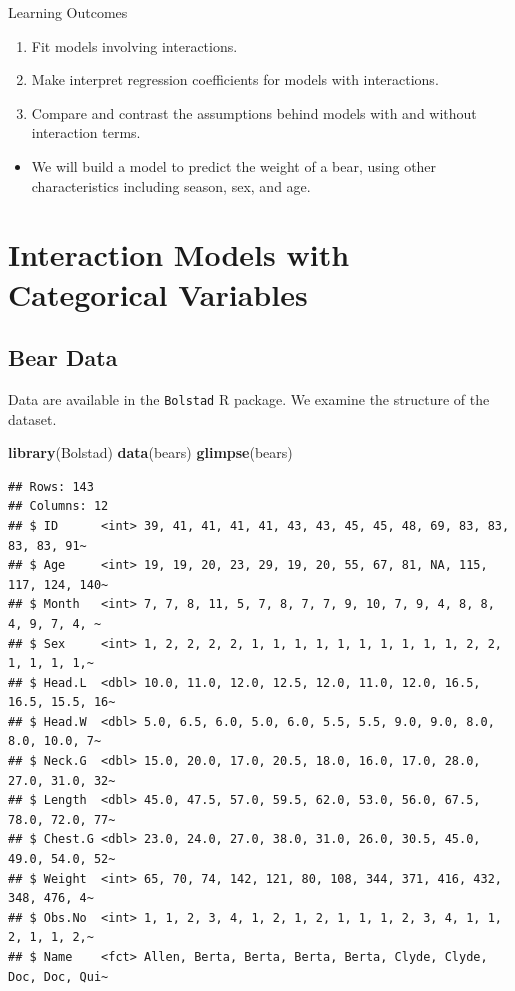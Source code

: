 \documentclass[]{book}
\newenvironment{Shaded}{\begin{snugshade}}{\end{snugshade}}
\newcommand{\KeywordTok}[1]{\textcolor[rgb]{0.13,0.29,0.53}{\textbf{#1}}}
\newcommand{\NormalTok}[1]{#1}
\providecommand{\tightlist}{%
  \setlength{\itemsep}{0pt}\setlength{\parskip}{0pt}}
\begin{document}
Learning Outcomes

\begin{enumerate}
\def\labelenumi{\arabic{enumi}.}
\tightlist
\item
  Fit models involving interactions.
\item
  Make interpret regression coefficients for models with interactions.\\
\item
  Compare and contrast the assumptions behind models with and without
  interaction terms.
\end{enumerate}

\begin{itemize}
\tightlist
\item
  We will build a model to predict the weight of a bear, using other
  characteristics including season, sex, and age.
\end{itemize}

\section{Interaction Models with Categorical
Variables}\label{interaction-models-with-categorical-variables-1}

\subsection{Bear Data}\label{bear-data}

Data are available in the \texttt{Bolstad} R package. We examine the
structure of the dataset.

\begin{Shaded}
\begin{Highlighting}[]
\KeywordTok{library}\NormalTok{(Bolstad)}
\KeywordTok{data}\NormalTok{(bears)}
\KeywordTok{glimpse}\NormalTok{(bears)}
\end{Highlighting}
\end{Shaded}

\begin{verbatim}
## Rows: 143
## Columns: 12
## $ ID      <int> 39, 41, 41, 41, 41, 43, 43, 45, 45, 48, 69, 83, 83, 83, 83, 91~
## $ Age     <int> 19, 19, 20, 23, 29, 19, 20, 55, 67, 81, NA, 115, 117, 124, 140~
## $ Month   <int> 7, 7, 8, 11, 5, 7, 8, 7, 7, 9, 10, 7, 9, 4, 8, 8, 4, 9, 7, 4, ~
## $ Sex     <int> 1, 2, 2, 2, 2, 1, 1, 1, 1, 1, 1, 1, 1, 1, 1, 2, 2, 1, 1, 1, 1,~
## $ Head.L  <dbl> 10.0, 11.0, 12.0, 12.5, 12.0, 11.0, 12.0, 16.5, 16.5, 15.5, 16~
## $ Head.W  <dbl> 5.0, 6.5, 6.0, 5.0, 6.0, 5.5, 5.5, 9.0, 9.0, 8.0, 8.0, 10.0, 7~
## $ Neck.G  <dbl> 15.0, 20.0, 17.0, 20.5, 18.0, 16.0, 17.0, 28.0, 27.0, 31.0, 32~
## $ Length  <dbl> 45.0, 47.5, 57.0, 59.5, 62.0, 53.0, 56.0, 67.5, 78.0, 72.0, 77~
## $ Chest.G <dbl> 23.0, 24.0, 27.0, 38.0, 31.0, 26.0, 30.5, 45.0, 49.0, 54.0, 52~
## $ Weight  <int> 65, 70, 74, 142, 121, 80, 108, 344, 371, 416, 432, 348, 476, 4~
## $ Obs.No  <int> 1, 1, 2, 3, 4, 1, 2, 1, 2, 1, 1, 1, 2, 3, 4, 1, 1, 2, 1, 1, 2,~
## $ Name    <fct> Allen, Berta, Berta, Berta, Berta, Clyde, Clyde, Doc, Doc, Qui~
\end{verbatim}
\end{document}
